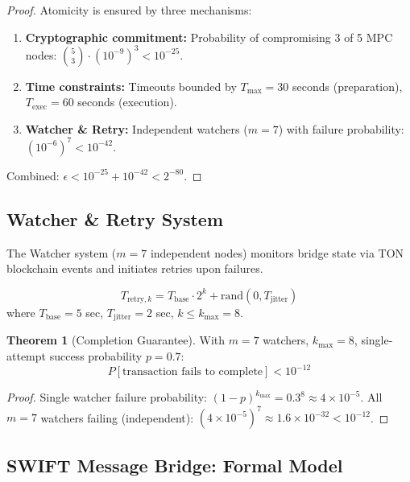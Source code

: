 \documentclass[12pt,a4paper]{article}
\theoremstyle{definition}
\newtheorem{theorem}{Theorem}[section]
\theoremstyle{remark}
\begin{document}
\begin{proof}
Atomicity is ensured by three mechanisms:
\begin{enumerate}
    \item \textbf{Cryptographic commitment:} Probability of compromising 3 of 5 MPC nodes: $\binom{5}{3} \cdot (10^{-9})^3 < 10^{-25}$.
    \item \textbf{Time constraints:} Timeouts bounded by $T_{\max} = 30$ seconds (preparation), $T_{\text{exec}} = 60$ seconds (execution).
    \item \textbf{Watcher \& Retry:} Independent watchers ($m = 7$) with failure probability: $(10^{-6})^7 < 10^{-42}$.
\end{enumerate}
Combined: $\epsilon < 10^{-25} + 10^{-42} < 2^{-80}$.
\end{proof}

\subsection{Watcher \& Retry System}

The Watcher system ($m = 7$ independent nodes) monitors bridge state via TON blockchain events and initiates retries upon failures.

\begin{equation}
T_{\text{retry},k} = T_{\text{base}} \cdot 2^k + \text{rand}(0, T_{\text{jitter}})
\end{equation}
where $T_{\text{base}} = 5$ sec, $T_{\text{jitter}} = 2$ sec, $k \leq k_{\max} = 8$.

\begin{theorem}[Completion Guarantee]
\label{thm:completion-guarantee}
With $m = 7$ watchers, $k_{\max} = 8$, single-attempt success probability $p = 0.7$:
\begin{equation}
P[\text{transaction fails to complete}] < 10^{-12}
\end{equation}
\end{theorem}

\begin{proof}
Single watcher failure probability: $(1-p)^{k_{\max}} = 0.3^8 \approx 4 \times 10^{-5}$. All $m = 7$ watchers failing (independent): $(4 \times 10^{-5})^7 \approx 1.6 \times 10^{-32} < 10^{-12}$.
\end{proof}

\subsection{SWIFT Message Bridge: Formal Model}
\end{document}
